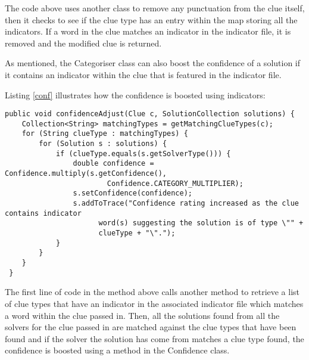 The code above uses another class to remove any punctuation from the clue
itself, then it checks to see if the clue type has an entry within the map
storing all  the indicators. If a word in the clue matches an indicator in the
indicator file, it is  removed and the modified clue is returned.

As mentioned, the Categoriser class can also boost the confidence of a solution
if  it contains an indicator within the clue that is featured in the indicator
file.

Listing \ref{conf} illustrates how the confidence is boosted using indicators:

\begin{lstlisting}[caption={Boosting the confidence of a solution},
                   label=conf]  
 public void confidenceAdjust(Clue c, SolutionCollection solutions) {
	Collection<String> matchingTypes = getMatchingClueTypes(c);
	for (String clueType : matchingTypes) {
		for (Solution s : solutions) {
			if (clueType.equals(s.getSolverType())) {
				double confidence = Confidence.multiply(s.getConfidence(),
						Confidence.CATEGORY_MULTIPLIER);
				s.setConfidence(confidence);
				s.addToTrace("Confidence rating increased as the clue contains indicator
                      word(s) suggesting the solution is of type \"" + 
                      clueType + "\".");
			}
		}
	}
 }
\end{lstlisting}

The first line of code in the method above calls another method to retrieve  a
list of clue types that have an indicator in the associated indicator file which
matches a word  within the clue passed in. Then, all the solutions found from
all the solvers for the clue passed in  are matched against the clue types that
have been found and if the solver the solution has come  from matches a clue
type found, the confidence is boosted using a method in the Confidence class.
